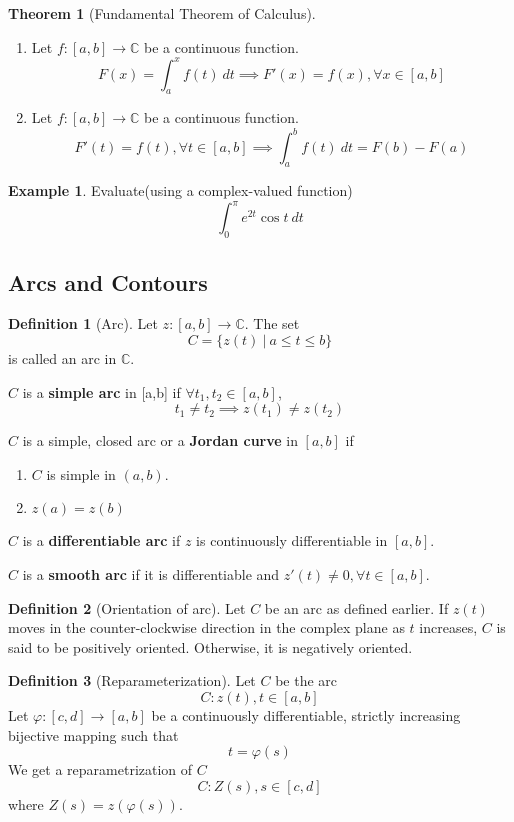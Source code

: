 \documentclass[10pt, a4paper]{extarticle}
\theoremstyle{definition}
\newtheorem{thm}{Theorem}
\newtheorem{defn}{Definition}
\newtheorem{eg}{Example}
\begin{document}
\begin{thm}[Fundamental Theorem of Calculus]
	\hfill
	\begin{enumerate}
		\item Let $f:[a,b]\to\mathbb{C}$ be a continuous function.
		      \[F(x)=\int_a^x f(t)\ dt\implies F'(x)=f(x),\forall x\in[a,b]\]
		\item Let $f:[a,b]\to\mathbb{C}$ be a continuous function.
		      \[F'(t)=f(t),\forall t\in[a,b]\implies\int_a^bf(t)\ dt=F(b)-F(a)\]
	\end{enumerate}
\end{thm}
\begin{eg}
	Evaluate(using a complex-valued function)\[\int_0^\pi e^{2t}\cos t\ dt\]
\end{eg}

\subsection{Arcs and Contours}
\begin{defn}[Arc]
	Let $z:[a,b]\to\mathbb{C}$. The set
	\[C=\{z(t)\ |\ a\leq t\leq b\}\]
	is called an arc in $\mathbb{C}$.

	$C$ is a \textbf{simple arc} in [a,b] if $\forall t_1,t_2\in[a,b]$,\[t_1\neq t_2\implies z(t_1)\neq z(t_2)\]

	$C$ is a simple, closed arc or a \textbf{Jordan curve} in $[a,b]$ if
	\begin{enumerate}
		\item $C$ is simple in $(a,b)$.
		\item $z(a)=z(b)$
	\end{enumerate}

	$C$ is a \textbf{differentiable arc} if $z$ is continuously differentiable in $[a,b]$.

	$C$ is a \textbf{smooth arc} if it is differentiable and $z'(t)\neq 0,\forall t\in[a,b]$.
\end{defn}

\begin{defn}[Orientation of arc]
	Let $C$ be an arc as defined earlier. If $z(t)$ moves in the counter-clockwise direction in the complex plane as $t$ increases, $C$ is said to be positively oriented. Otherwise, it is negatively oriented.
\end{defn}

\begin{defn}[Reparameterization]
	Let $C$ be the arc
	\[C:z(t), t\in[a,b]\] Let $\varphi:[c,d]\to [a,b]$ be a continuously differentiable, strictly increasing bijective mapping such that \[t=\varphi(s)\]
	We get a reparametrization of $C$
	\[C:Z(s), s\in[c,d]\]
	where $Z(s)=z(\varphi(s))$.
\end{defn}
\end{document}
